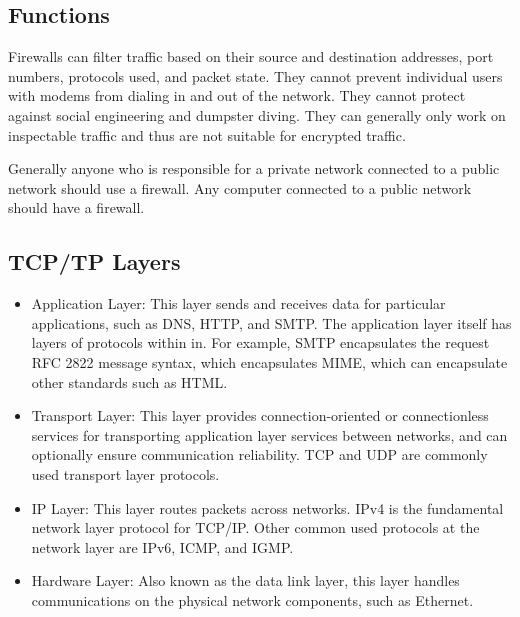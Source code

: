 \documentclass{math}
\begin{document}
\subsection*{Functions}
Firewalls can filter traffic based on their source and destination addresses,
port numbers, protocols used, and packet state. They cannot prevent individual
users with modems from dialing in and out of the network. They cannot protect
against social engineering and dumpster diving. They can generally only work on
inspectable traffic and thus are not suitable for encrypted traffic. \par
Generally anyone who is responsible for a private network connected to a public
network should use a firewall. Any computer connected to a public network should
have a firewall.

\subsection*{TCP/TP Layers}
\begin{itemize}
  \item Application Layer: This layer sends and receives data for particular
    applications, such as DNS, HTTP, and SMTP. The application layer itself has
    layers of protocols within in. For example, SMTP encapsulates the request
    RFC 2822 message syntax, which encapsulates MIME, which can encapsulate
    other standards such as HTML.
  \item Transport Layer: This layer provides connection-oriented or
    connectionless services for transporting application layer services between
    networks, and can optionally ensure communication reliability. TCP and UDP
    are commonly used transport layer protocols.
  \item IP Layer: This layer routes packets across networks. IPv4 is the
    fundamental network layer protocol for TCP/IP. Other common used protocols
    at the network layer are IPv6, ICMP, and IGMP.
  \item Hardware Layer: Also known as the data link layer, this layer handles
    communications on the physical network components, such as Ethernet.
\end{itemize}
\end{document}
